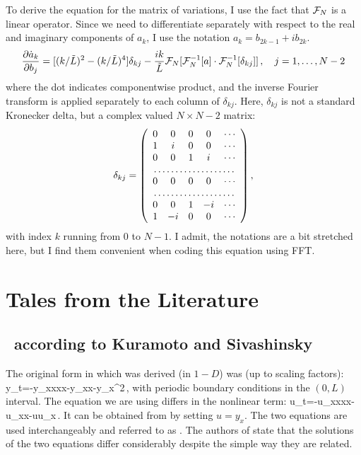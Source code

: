{To derive the equation for the matrix of variations, I use the fact
that ${\cal F}_N$ is a linear operator.  Since we need to
differentiate separately with respect to the real and imaginary
components of $a_k$, I use the notation $a_k = b_{2k-1} + ib_{2k}$.
\begin{equation}
  \frac{\partial \dot{a}_k}{\partial b_j} =
  [(k/\tilde{L})^2-(k/\tilde{L})^4]\delta_{kj} -
  \frac{ik}{\tilde{L}}{\cal F}_N[{\cal F}_N^{-1}[a]\cdot{\cal
  F}_N^{-1}[\delta_{kj}]]\,,\quad j = 1,\ldots,N-2
\end{equation}
where the dot indicates componentwise product, and the inverse
Fourier transform is applied separately to each column of
$\delta_{kj}$. Here, $\delta_{kj}$ is not a standard Kronecker
delta, but a complex valued $N\times N-2$ matrix:
\begin{equation}
  \delta_{kj} = \left(
  \begin{array}{ccccc}
  0 &  0 & 0 &  0 &\cdots\\
  1 &  i & 0 &  0 &\cdots\\
  0 &  0 & 1 &  i &\cdots\\
\multicolumn{5}{c}\dotfill \\
  0 &  0 & 0 &  0 &\cdots\\
\multicolumn{5}{c}\dotfill \\
  0 &  0 & 1 & -i &\cdots\\
  1 & -i & 0 &  0 &\cdots\\
  \end{array}  \right),
\end{equation}
with index $k$ running from 0 to $N-1$.  I admit, the notations are
a bit stretched here, but I find them convenient when coding this
equation using FFT.

\section{Tales from the Literature}

\subsection{\KSe\ according to Kuramoto and Sivashinsky}

The original form in which \KSe was derived (in $1-D$) was (up to scaling factors):
\beq
	y_t=-y_{xxxx}-y_{xx}-y_x^2\,,
	\label{eq:KSeOR}
\eeq
with periodic boundary conditions in the $(0,L)$ interval. The equation we are using
differs in the nonlinear term:
\beq 
	u_t=-u_{xxxx}-u_{xx}-uu_x\,.
	\label{eq:KSeAP}
\eeq
It can be obtained from  by setting $u=y_x$. The two equations are used interchangeably
and referred to as \KSe. The authors of  state that the solutions of the two equations
differ considerably despite the simple way they are related. 

}
